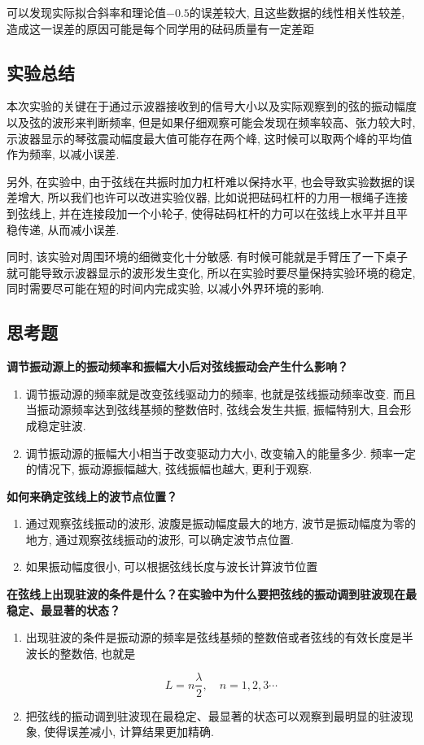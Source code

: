 \documentclass[zihao=5, UTF8]{article}
\theoremstyle{MyLineTheoremStyle} %
\theoremstyle{MyBlockTheoremStyle} %
\theoremstyle{MySubsubsectionStyle} %
\begin{document}
可以发现实际拟合斜率和理论值$-0.5$的误差较大, 且这些数据的线性相关性较差, 造成这一误差的原因可能是每个同学用的砝码质量有一定差距
\subsection{实验总结}
本次实验的关键在于通过示波器接收到的信号大小以及实际观察到的弦的振动幅度以及弦的波形来判断频率, 但是如果仔细观察可能会发现在频率较高、张力较大时, 示波器显示的琴弦震动幅度最大值可能存在两个峰, 这时候可以取两个峰的平均值作为频率, 以减小误差.

另外, 在实验中, 由于弦线在共振时加力杠杆难以保持水平, 也会导致实验数据的误差增大, 所以我们也许可以改进实验仪器, 比如说把砝码杠杆的力用一根绳子连接到弦线上, 并在连接段加一个小轮子, 使得砝码杠杆的力可以在弦线上水平并且平稳传递, 从而减小误差.

同时, 该实验对周围环境的细微变化十分敏感. 有时候可能就是手臂压了一下桌子就可能导致示波器显示的波形发生变化, 所以在实验时要尽量保持实验环境的稳定, 同时需要尽可能在短的时间内完成实验, 以减小外界环境的影响.
\subsection{思考题}
\textbf{调节振动源上的振动频率和振幅大小后对弦线振动会产生什么影响？}
\begin{enumerate}
    \item 调节振动源的频率就是改变弦线驱动力的频率, 也就是弦线振动频率改变. 而且当振动源频率达到弦线基频的整数倍时, 弦线会发生共振, 振幅特别大, 且会形成稳定驻波. 
    \item 调节振动源的振幅大小相当于改变驱动力大小, 改变输入的能量多少. 频率一定的情况下, 振动源振幅越大, 弦线振幅也越大, 更利于观察. 
\end{enumerate}

\textbf{如何来确定弦线上的波节点位置？}
\begin{enumerate}
    \item 通过观察弦线振动的波形, 波腹是振动幅度最大的地方, 波节是振动幅度为零的地方, 通过观察弦线振动的波形, 可以确定波节点位置. 
    \item 如果振动幅度很小, 可以根据弦线长度与波长计算波节位置
\end{enumerate}

\textbf{在弦线上出现驻波的条件是什么？在实验中为什么要把弦线的振动调到驻波现在最稳定、最显著的状态？}
\begin{enumerate}
    \item 出现驻波的条件是振动源的频率是弦线基频的整数倍或者弦线的有效长度是半波长的整数倍, 也就是

\begin{equation}
    L = n\frac{\lambda}{2}, \quad n = 1,2,3 \cdots
\end{equation}

    \item 把弦线的振动调到驻波现在最稳定、最显著的状态可以观察到最明显的驻波现象, 使得误差减小, 计算结果更加精确. 
\end{enumerate}
\end{document}
